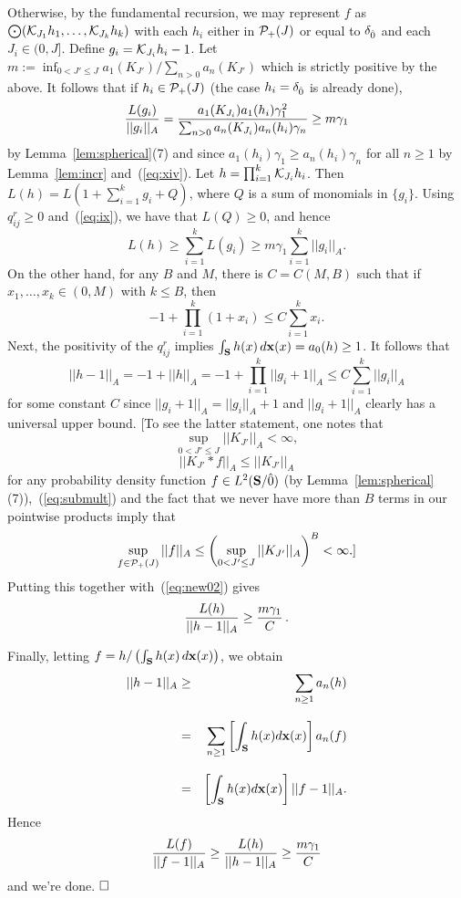 Otherwise, by the fundamental recursion, we may represent $f$ as
${\bigodot} ({\cal K}_{J_1} h_1 , \ldots , {\cal K}_{J_k} h_k)$ with each
$h_i$ either in ${\cal P}_+(J)$ or equal to $\delta_{{\hat{0}}}$ and each 
$J_i\in (0,J]$. Define $g_i = {\cal K}_{J_i} h_i - 1$.
Let $m :=\inf_{0< J'\le J} a_1 (K_{J'}) / \sum_{n > 0} a_n (K_{J'})$ which is
strictly positive by the above. It follows that if %
$h_i\in {\cal P}_+(J)$ (the case $h_i=\delta_{{\hat{0}}}$ is already done),
$${L (g_i) \over ||g_i ||_A} = {a_1 (K_{J_i}) a_1 (h_i) \gamma_1^2\over
   \sum_{n > 0} a_n (K_{J_i}) a_n (h_i) \gamma_n} \geq m\gamma_1$$
by Lemma~\ref{lem:spherical}(7) and
since $a_1(h_i)\gamma_1 \ge a_n(h_i)\gamma_n$ for all $n\ge 1$ by
Lemma~\ref{lem:incr} and~(\ref{eq:xiv}).
Let $h = \prod_{i=1}^k {\cal K}_{J_i} h_i$.  Then
$L (h) = L(1 + \sum_{i=1}^k g_i + Q)$, where $Q$ is a sum 
of monomials in $\{ g_i \}$. Using $q^r_{ij} \ge 0$
and~(\ref{eq:ix}), we have that $L(Q) \geq 0$, and hence
\begin{equation} \label{eq:new02}
L(h) \geq \sum_{i=1}^k L(g_i) \geq m \gamma_1\sum_{i=1}^k ||g_i ||_A .
\end{equation}
On the other hand, for any $B$ and $M$, there is $C = C(M,B)$ such that
if $x_1 , \ldots , x_k \in (0,M)$ with $k\le B$, then
$$ -1 + \prod_{i=1}^k (1 + x_i) \leq C \sum_{i=1}^k x_i .$$
Next, 
the positivity of the $q^r_{ij}$ implies 
$\int_{{\bf S}} h(x) \, d{\bf x}(x) = a_0 (h) \geq 1$. It follows that 
$$||h - 1||_A =  -1+ ||h ||_A = 
-1 + \prod_{i=1}^k ||g_i + 1||_A \leq C \sum_{i=1}^k 
   ||g_i||_A $$
for some constant $C$ since $||g_i+1 ||_A=||g_i ||_A +1$ and
$||g_i+1 ||_A$ clearly has a universal upper bound. [To see the latter
statement, one notes that
$$
\sup_{0<J' \le J} ||K_{J'}||_A <\infty,
$$
$$
||K_{J'} *f||_A \le ||K_{J'} ||_A
$$
for any probability density function $f\in L^2 ({\bf S}/{\hat{0}})$ 
(by Lemma~\ref{lem:spherical}(7)),~(\ref{eq:submult}) and the fact that we 
never have more than $B$ terms in our pointwise products imply that
$$
\sup_{f\in {\cal P}_+(J)}||f||_A \le 
\left(\sup_{0<J' \le J} ||K_{J'}||_A \right)^B <\infty.]
$$
Putting this together with~(\ref{eq:new02}) gives
$${L(h) \over ||h - 1||_A} \geq {m \gamma_1\over C} \, .$$

Finally, letting $f = h / \left(\int_{{\bf S}} h(x) \, d{\bf x}(x)\right)$, we obtain
\begin{eqnarray*}
||h - 1||_A  & \ge &  \sum_{n\ge 1} a_n(h) 
\\[2ex]
& = & \sum_{n\ge 1} \left[\int_{{\bf S}} h(x)d{\bf x}(x)\right] a_n(f) \\[2ex]
& = &  \left[\int_{{\bf S}} h(x)d{\bf x}(x)\right]  ||f - 1||_A.
\end{eqnarray*}
Hence
$$
{L(f)\over ||f - 1||_A} \ge {L(h)\over ||h - 1||_A} \ge {m \gamma_1\over C}
$$
and we're done. $\qed$

